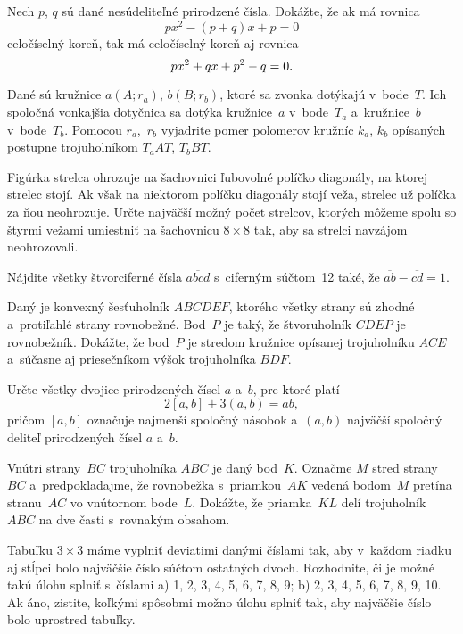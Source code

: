 {%
Nech $p$, $q$ sú dané nesúdeliteľné prirodzené čísla. Dokážte, že ak má rovnica
$$
px^2-(p+q)x+p=0
$$
celočíselný koreň, tak má celočíselný koreň aj rovnica
$$
\belowdisplayskip 0pt
px^2+qx+p^2-q=0.
$$
}

{%
Dané sú kružnice $a(A; r_a)$, $b(B; r_b)$, ktoré sa zvonka dotýkajú v~bode~$T$.
Ich spoločná vonkajšia dotyčnica sa dotýka kružnice~$a$ v~bode~$T_a$ a~kružnice~$b$
v~bode~$T_b$. Pomocou $r_a$,~$r_b$ vyjadrite pomer polomerov kružníc $k_a$, $k_b$
opísaných postupne trojuholníkom $T_aAT$, $T_bBT$.}

{%
Figúrka strelca ohrozuje na šachovnici ľubovoľné políčko diagonály, na ktorej strelec stojí.
Ak však na niektorom políčku diagonály stojí veža, strelec už políčka za ňou neohrozuje.
Určte najväčší možný počet strelcov, ktorých môžeme spolu so štyrmi vežami umiestniť
na šachovnicu $8\times8$ tak, aby sa strelci navzájom neohrozovali.}

{%
Nájdite všetky štvorciferné čísla $\overline{abcd}$ s~ciferným
súčtom~12 také, že $\overline{ab}-\overline{cd}=1$.}

{%
Daný je konvexný šesťuholník $ABCDEF$, ktorého všetky strany sú zhodné
a~protiľahlé strany rovnobežné. Bod~$P$ je taký, že štvoruholník
$CDEP$ je rovnobežník. Dokážte, že bod~$P$ je stredom kružnice opísanej
trojuholníku $ACE$ a~súčasne aj priesečníkom výšok trojuholníka $BDF$.}

{%
Určte všetky dvojice prirodzených čísel $a$ a~$b$, pre ktoré platí
$$
2[a,b]+3(a,b)=ab,
$$
pričom $[a,b]$ označuje najmenší spoločný násobok a~$(a,b)$
najväčší spoločný deliteľ prirodzených čísel $a$ a~$b$.}

{%
Vnútri strany~$BC$ trojuholníka $ABC$ je daný bod~$K$. Označme $M$ stred
strany~$BC$ a~predpokladajme, že rovnobežka s~priamkou~$AK$ vedená bodom~$M$
pretína stranu~$AC$ vo vnútornom bode~$L$. Dokážte, že priamka~$KL$ delí
trojuholník $ABC$ na dve časti s~rovnakým obsahom.}

{%
Tabuľku $3\times 3$ máme vyplniť deviatimi danými číslami tak, aby
v~každom riadku aj stĺpci bolo najväčšie číslo súčtom ostatných dvoch.
Rozhodnite, či je možné takú úlohu splniť s~číslami
\ite a) 1, 2, 3, 4, 5, 6, 7, 8, 9;
\ite b) 2, 3, 4, 5, 6, 7, 8, 9, 10.
\endgraf\noindent
Ak áno, zistite, koľkými spôsobmi možno úlohu splniť tak, aby
najväčšie číslo bolo uprostred tabuľky.}

